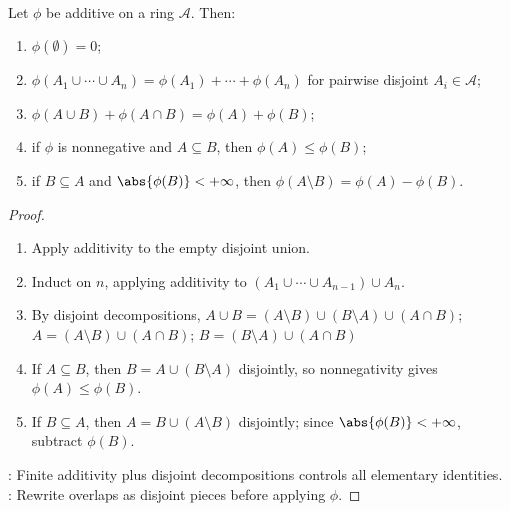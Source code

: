 \begin{proposition} \label{prop:additive-set-function-basic-laws} \\
Let $\phi$ be additive on a ring $\mathcal{A}$. Then:
\begin{enumerate}[label=(\roman*)]
\setlength{\itemsep}{0pt}
\item $\phi(\emptyset)=0$;
\item $\phi(A_1\cup\cdots\cup A_n)=\phi(A_1)+\cdots+\phi(A_n)$ for pairwise disjoint $A_i\in\mathcal{A}$;
\item $\phi(A\cup B)+\phi(A\cap B)=\phi(A)+\phi(B)$;
\item if $\phi$ is nonnegative and $A\subseteq B$, then $\phi(A)\leq\phi(B)$;
\item if $B\subseteq A$ and $\abs{\phi(B)}<+\infty$, then $\phi(A\setminus B)=\phi(A)-\phi(B)$.
\end{enumerate}
\begin{proof}
\begin{enumerate}[label=(\roman*)]
\setlength{\itemsep}{0pt}
\item Apply additivity to the empty disjoint union.
\item Induct on $n$, applying additivity to $(A_1\cup\cdots\cup A_{n-1})\cup A_n$.
\item By disjoint decompositions, $A\cup B=(A\setminus B)\cup(B\setminus A)\cup(A\cap B)$; $A=(A\setminus B)\cup(A\cap B)$; $B=(B\setminus A)\cup(A\cap B)$
\item If $A\subseteq B$, then $B=A\cup(B\setminus A)$ disjointly, so nonnegativity gives $\phi(A)\leq\phi(B)$.
\item If $B\subseteq A$, then $A=B\cup(A\setminus B)$ disjointly; since $\abs{\phi(B)}<+\infty$, subtract $\phi(B)$.
\end{enumerate}
: Finite additivity plus disjoint decompositions controls all elementary identities.\\
: Rewrite overlaps as disjoint pieces before applying $\phi$.
\end{proof}
\end{proposition}


